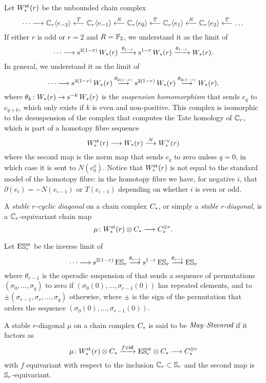 Let $W^{\mathrm{st}}_{*}(r)$ be the unbounded chain complex
\[
\dotsb \longrightarrow \mathbb{C}_r\langle e_{-2}\rangle
\overset{T}{\longleftarrow}
\mathbb{C}_r\langle e_{-1}\rangle
\overset{N}{\longleftarrow}
\mathbb{C}_r\langle e_0\rangle
\overset{T}{\longleftarrow}
\mathbb{C}_r\langle e_{1}\rangle
\overset{N}{\longleftarrow}
\mathbb{C}_r\langle e_{2}\rangle
\overset{T}{\longleftarrow}
\dots
\]
If either $r$ is odd or $r=2$ and $R=\mathbb{F}_2$, we understand it as the limit of
\[
\dotsb \longrightarrow \operatorname{s}^{2(1-r)}W_{*}(r) \xrightarrow{\theta_{1-r}} \operatorname{s}^{1-r} W_{*}(r) \xrightarrow{\theta_{1-r}} W_{*}(r).
\]
In general, we understand it as the limit of
\[
\dotsb \longrightarrow \operatorname{s}^{4(1-r)}W_{*}(r)\overset{\theta_{2(1-r)}}{\longrightarrow} \operatorname{s}^{2(1-r)} W_{*}(r) \overset{\theta_{2(1-r)}}{\longrightarrow} W_{*}(r).
\]
where $\theta_{k} \colon W_{*}(r) \to \operatorname{s}^{-k} W_{*}(r)$ is the \emph{suspension homomorphism} that sends $e_{q}$ to $e_{q+k}$, which only exists if $k$ is even and non-positive.
This complex is isomorphic to the desuspension of the complex that computes the Tate homology of $\mathbb{C}_r$, which is part of a homotopy fibre sequence
\[
W^{\mathrm{st}}_{*}(r) \longrightarrow W_{*}(r)\overset{N}{\longrightarrow} W^\vee_{*}(r)
\]
where the second map is the norm map that sends $e_q$ to zero unless $q=0$, in which case it is sent to $N(e_0^\dd)$.
Notice that $W^{\mathrm{st}}_{*}(r)$ is not equal to the standard model of the homotopy fibre: in the homotopy fibre we have, for negative $i$, that $\partial(e_i) = -N(e_{i-1})$ or $T(e_{i-1})$ depending on whether $i$ is even or odd.

\begin{definition}
	A \emph{stable $r$-cyclic diagonal} on a chain complex $C_{*}$, or simply a \textit{stable $r$-diagonal}, is a $\mathbb{C}_r$-equivariant chain map
	\[
	\mu \colon W^{\mathrm{st}}_{*}(r) \otimes C_{*} \longrightarrow C_{*}^{\otimes r}.
	\]
\end{definition}

\begin{definition}
	Let $\mathrm{E}\mathbb{S}^{\mathrm{st}}_r$ be the inverse limit of
	\[
	\dotsb \longrightarrow \operatorname{s}^{2(1-r)} \mathrm{E}\mathbb{S}_r\overset{\theta_{r-1}}{\longrightarrow}\operatorname{s}^{1-r} \mathrm{E}\mathbb{S}_r\overset{\theta_{r-1}}{\longrightarrow} \mathrm{E}\mathbb{S}_r
	\]
	where $\theta_{r-1}$ is the operadic suspension of \cite{berger2004combinatorial} that sends a sequence of permutations $(\sigma_0,\dots,\sigma_q)$ to zero if $(\sigma_0(0),\dots,\sigma_{r-1}(0))$ has repeated elements, and to $\pm (\sigma_{r-1},\sigma_r,\dots,\sigma_q)$ otherwise, where $\pm$ is the sign of the permutation that orders the sequence $(\sigma_0(0),\dots,\sigma_{r-1}(0))$.
\end{definition}

\begin{definition}
	A stable $r$-diagonal $\mu$ on a chain complex $C_{*}$ is said to be $\emph{May--Steenrod}$ if it factors as
	\[
	\mu \colon W^{\mathrm{st}}_{*}(r) \otimes C_{*} \xrightarrow{f \otimes \mathsf{id}} \mathrm{E}\mathbb{S}^{\mathrm{st}}_r \otimes C_{*} \longrightarrow C_{*}^{\otimes r}
	\]
	with $f$ equivariant with respect to the inclusion $\mathbb{C}_r \subset \mathbb{S}_r$ and the second map is $\mathbb{S}_r$-equivariant.
\end{definition}

